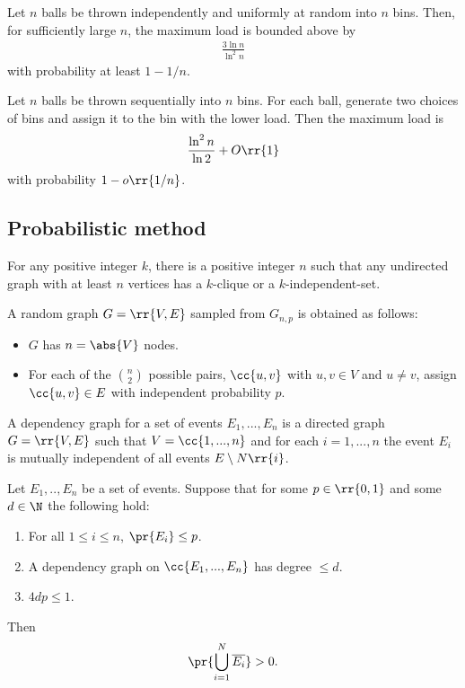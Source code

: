 \documentclass{article}
\begin{document}
\begin{lemma}
  Let $n$ balls be thrown independently and uniformly at random into $n$ bins. Then, for sufficiently
  large $n$, the maximum load is bounded above by
  \begin{align*}
    \frac{3\ln{n}}{\ln^2{n}}
  \end{align*}
  with probability at least $1-1/n$.
\end{lemma}

\begin{lemma}
  Let $n$ balls be thrown sequentially into $n$ bins. For each ball, generate two choices of bins
  and assign it to the bin with the lower load. Then the maximum load is
  \begin{align*}
    \frac{\ln^2 n}{\ln 2}+O\rr{1}
  \end{align*}
  with probability $1-o\rr{1/n}$.
\end{lemma}

\subsection{Probabilistic method}

\begin{theorem}[Ramsay]
  For any positive integer $k$, there is a positive integer $n$ such that any undirected
  graph with at least $n$ vertices has a $k$-clique or a $k$-independent-set.
\end{theorem}

\begin{definition}
  A random graph $G=\rr{V,E}$ sampled from $G_{n,p}$ is obtained as follows:
  \begin{itemize}
    \item $G$ has $n=\abs{V}$ nodes.
    \item For each of the $\binom{n}{2}$ possible pairs, $\cc{u,v}$ with $u,v\in V$ and
      $u\neq v$, assign $\cc{u,v}\in E$ with independent probability $p$.
  \end{itemize}
\end{definition}

\begin{definition}
  A dependency graph for a set of events $E_1,...,E_n$ is a directed graph $G=\rr{V,E}$
  such that $V=\cc{1,...,n}$ and for each $i=1,...,n$ the event $E_i$ is mutually
  independent of all events $E\setminus N\rr{i}$.
\end{definition}

\begin{theorem}
  Let $E_1,..,E_n$ be a set of events. Suppose that for some $p\in \rr{0,1}$ and some
  $d\in\N$ the following hold:
  \begin{enumerate}
    \item For all $1\leq i\leq n$, $\pr{E_i}\leq p$.
    \item A dependency graph on $\cc{E_1,...,E_n}$ has degree $\leq d$.
    \item $4dp\leq 1$.
  \end{enumerate}
  Then
  \begin{align*}
    \pr{\bigcup_{i=1}^N \overline{E_i}} > 0.
  \end{align*}
\end{theorem}
\end{document}
